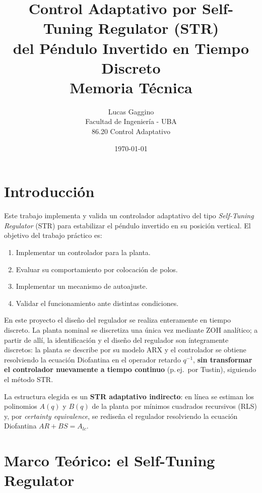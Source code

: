 \documentclass[a4paper,11pt]{report}
\title{\textbf{Control Adaptativo por Self-Tuning Regulator (STR) \\ del Péndulo Invertido en Tiempo Discreto} \\[0.4em]
\large Memoria Técnica}
\author{Lucas Gaggino \\ \small Facultad de Ingeniería - UBA \\ \small 86.20 Control Adaptativo}
\date{\today}
\begin{document}
\maketitle
\tableofcontents
\newpage

\section{Introducción}

Este trabajo implementa y valida un controlador adaptativo del tipo
\emph{Self-Tuning Regulator} (STR) para estabilizar el péndulo invertido en su
posición vertical. El objetivo del trabajo práctico es:

\begin{enumerate}[nosep]
  \item Implementar un controlador para la planta.
  \item Evaluar su comportamiento por colocación de polos.
  \item Implementar un mecanismo de autoajuste.
  \item Validar el funcionamiento ante distintas condiciones.
\end{enumerate}

En este proyecto el diseño del regulador se realiza enteramente en tiempo discreto. La
planta nominal se discretiza una única vez mediante ZOH analítico; a
partir de allí, la identificación y el diseño del regulador son íntegramente
discretos: la planta se describe por su modelo ARX y el controlador se obtiene
resolviendo la ecuación Diofantina en el operador retardo $q^{-1}$, \textbf{sin
transformar el controlador nuevamente a tiempo continuo} (p.\,ej.\ por Tustin),
siguiendo el método STR.

La estructura elegida es un \textbf{STR adaptativo indirecto}: en línea se
estiman los polinomios $A(q)$ y $B(q)$ de la planta por mínimos cuadrados
recursivos (RLS) y, por \emph{certainty equivalence}, se rediseña el regulador
resolviendo la ecuación Diofantina $A R + B S = A_{lc}$.

\section{Marco Teórico: el Self-Tuning Regulator}
\end{document}
